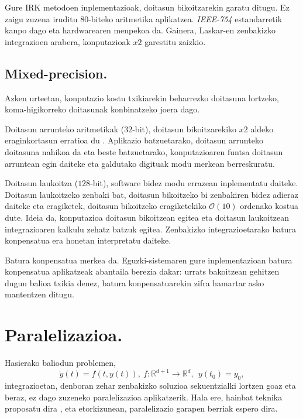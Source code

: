 Gure IRK metodoen inplementazioak, doitasun bikoitzarekin garatu ditugu. Ez zaigu zuzena iruditu $80$-biteko aritmetika aplikatzea. \emph{IEEE-754} estandarretik kanpo dago eta hardwarearen menpekoa da. Gainera, Laskar-en \cite{Laskar2011} zenbakizko integrazioen arabera, konputazioak $x2$ garestitu zaizkio. 


\subsection*{Mixed-precision.}


Azken urteetan, konputazio kostu txikiarekin beharrezko doitasuna lortzeko, koma-higikorreko doitasunak konbinatzeko joera dago.

Doitasun arrunteko aritmetikak ($32$-bit), doitasun bikoitzarekiko $x2$ aldeko eraginkortasun erratioa  du \cite{Dongarra2017}. Aplikazio batzuetarako, doitasun arrunteko doitasuna nahikoa da eta beste batzuetarako, konputazioaren funtsa doitasun arruntean egin daiteke eta galdutako digituak modu merkean berreskuratu.

Doitasun laukoitza ($128$-bit), software bidez modu errazean  inplementatu daiteke. Doitasun laukoitzeko zenbaki bat, doitasun bikoitzeko bi zenbakiren bidez adieraz daiteke eta eragiketek, doitasun bikoitzeko eragiketekiko $\mathcal{O}(10)$ ordenako kostua dute. Ideia da, konputazioa doitasun bikoitzean egitea eta doitasun laukoitzean integrazioaren kalkulu zehatz batzuk egitea. Zenbakizko integrazioetarako batura konpensatua era honetan interpretatu daiteke. 

Batura konpensatua merkea da. Eguzki-sistemaren gure inplementazioan batura konpensatua aplikatzeak abantaila berezia dakar: urrats bakoitzean gehitzen dugun balioa txikia denez, batura konpensatuarekin zifra hamartar asko mantentzen ditugu.            

\section{Paralelizazioa.}


Hasierako baliodun problemen,
\begin{equation}
 \label{eq:eztivp}
\dot{y}(t)=f(t,y(t)), \ f: \mathbb{R}^{d+1} \longrightarrow \mathbb{R}^d, \ \ y(t_0)=y_0,
\end{equation} 
integrazioetan, denboran zehar zenbakizko soluzioa sekuentzialki lortzen goaz eta beraz, ez dago zuzeneko paralelizazioa aplikatzerik. Hala ere, hainbat teknika proposatu dira \cite{Burrage1993}, eta etorkizunean, paralelizazio garapen berriak espero dira.   

